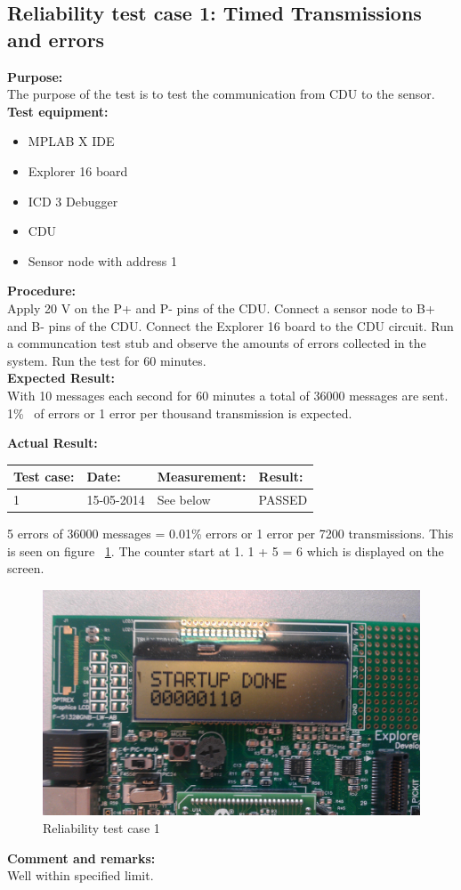 \subsection{Reliability test case 1: Timed Transmissions and errors}
\textbf{Purpose:}\\
The purpose of the test is to test the communication from CDU to the sensor.\\

\textbf{Test equipment:}
\begin{itemize}
\item MPLAB X IDE
\item Explorer 16 board
\item ICD 3 Debugger
\item CDU
\item Sensor node with address 1
\end{itemize}

\textbf{Procedure:}\\
Apply 20 V on the P+ and P- pins of the CDU. Connect a sensor node to B+ and B- pins of the CDU. Connect the Explorer 16 board to the CDU circuit. Run a communcation test stub and observe the amounts of errors collected in the system. Run the test for 60 minutes.\\

\textbf{Expected Result:}\\
With 10 messages each second for 60 minutes a total of 36000 messages are sent. 1\% ~of errors or 1 error per thousand transmission is expected.

\textbf{Actual Result:}\\
\begin{table}[H]
\centering
\begin{tabular}{|p{2cm}|p{2cm}|p{3cm}|p{2cm}|}\hline
\textbf{Test case:} & \textbf{Date:} & \textbf{Measurement:} & \textbf{Result:} \\ \hline
1 & 15-05-2014 & See below & PASSED \\ \hline
\end{tabular}
\end{table}
5 errors of 36000 messages = 0.01\% errors or 1 error per 7200 transmissions. This is seen on figure ~\ref{fig:Reliacase1}. The counter start at 1. 1 + 5 = 6 which is displayed on the screen.
\begin{figure}[H]
\centering
\includegraphics[width=1\textwidth]{billeder/reliabilitytestcase1}
\caption{Reliability test case 1}
\label{fig:Reliacase1}
\end{figure}

\textbf{Comment and remarks:}\\
Well within specified limit.\\
